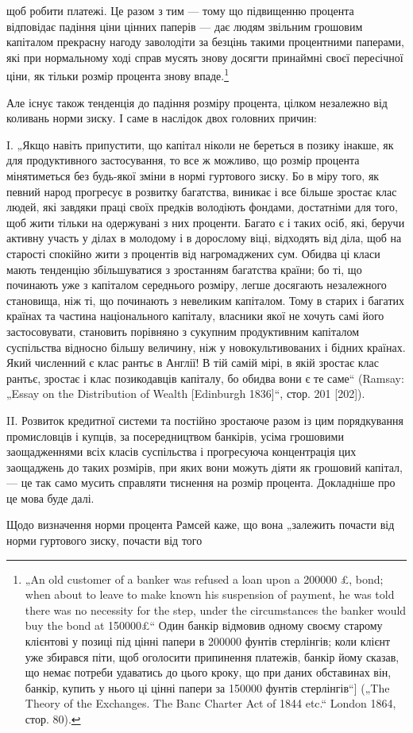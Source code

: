 щоб робити платежі. Це разом з тим — тому що підвищенню процента
відповідає падіння ціни цінних паперів — дає людям звільним
грошовим капіталом прекрасну нагоду заволодіти за безцінь
такими процентними паперами, які при нормальному ході справ
мусять знову досягти принаймні своєї пересічної ціни, як тільки
розмір процента знову впаде.\footnote{
„An old customer of a banker was refused a loan upon a 200000 £, bond;
when about to leave to make known his suspension of payment, he was told
there was no necessity for the step, under the circumstances the banker would buy
the bond at 150000£“ Один банкір відмовив одному своєму старому клієнтові
у позиці під цінні папери в 200000 фунтів стерлінгів; коли клієнт уже збирався
піти, щоб оголосити припинення платежів, банкір йому сказав, що немає потреби
удаватись до цього кроку, що при даних обставинах він, банкір, купить
у нього ці цінні папери за 150000 фунтів стерлінгів“] („The Theory of the Exchanges.
The Banc Charter Act of 1844 etc.“ London 1864, стор. 80).
}

Але існує також тенденція до падіння розміру процента, цілком
незалежно від коливань норми зиску. І саме в наслідок
двох головних причин:

I. „Якщо навіть припустити, що капітал ніколи не береться
в позику інакше, як для продуктивного застосування, то все ж
можливо, що розмір процента мінятиметься без будь-якої зміни
в нормі гуртового зиску. Бо в міру того, як певний народ прогресує
в розвитку багатства, виникає і все більше зростає клас
людей, які завдяки праці своїх предків володіють фондами, достатніми
для того, щоб жити тільки на одержувані з них проценти.
Багато є і таких осіб, які, беручи активну участь у ділах в молодому
і в дорослому віці, відходять від діла, щоб на старості
спокійно жити з процентів від нагромаджених сум. Обидва ці
класи мають тенденцію збільшуватися з зростанням багатства
країни; бо ті, що починають уже з капіталом середнього розміру,
легше досягають незалежного становища, ніж ті, що починають
з невеликим капіталом. Тому в старих і багатих країнах
та частина національного капіталу, власники якої не хочуть самі
його застосовувати, становить порівняно з сукупним продуктивним
капіталом суспільства відносно більшу величину, ніж
у новокультивованих і бідних країнах. Який численний є клас
рантьє в Англії! В тій самій мірі, в якій зростає клас рантьє,
зростає і клас позикодавців капіталу, бо обидва вони є те саме“
(Ramsay: „Essay on the Distribution of Wealth [Edinburgh 1836]“,
стор. 201 [202]).

II. Розвиток кредитної системи та постійно зростаюче разом
із цим порядкування промисловців і купців, за посередництвом
банкірів, усіма грошовими заощадженнями всіх класів суспільства
і прогресуюча концентрація цих заощаджень до таких розмірів,
при яких вони можуть діяти як грошовий капітал, — це
так само мусить справляти тиснення на розмір процента.
Докладніше про це мова буде далі.

Щодо визначення норми процента Рамсей каже, що вона „залежить
почасти від норми гуртового зиску, почасти від того